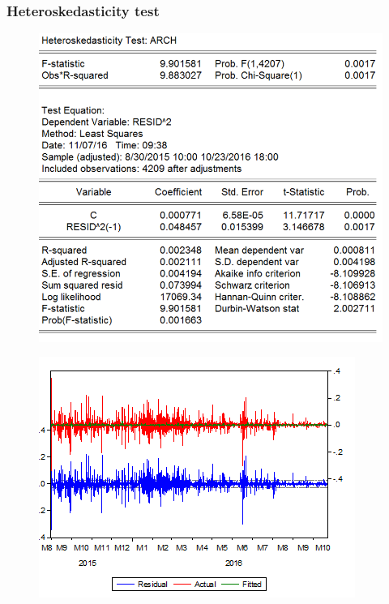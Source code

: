 \documentclass[11pt]{report}
\begin{document}
\subsubsection*{Heteroskedasticity test}
\begin{figure}[!h]
\centering
\includegraphics[scale=0.5]{Appendix/chap2/15}
\end{figure}
\begin{figure}[!h]
\centering
\includegraphics[scale=1.5]{Appendix/chap2/16}
\end{figure}
\clearpage
\end{document}
